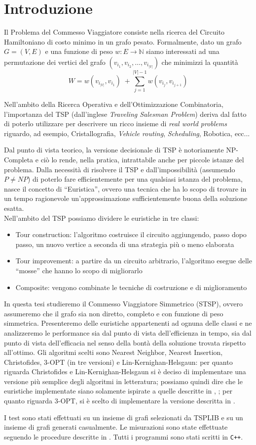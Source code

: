 \chapter*{Introduzione}

Il Problema del Commesso Viaggiatore consiste nella ricerca del Circuito Hamiltoniano
di costo minimo in un grafo pesato. Formalmente, dato un grafo $G=(V,E)$ e una funzione di peso
$w: E \rightarrow \mathbb{N}$ siamo interessati ad una permutazione dei vertici del grafo
$(v_{i_1}, v_{i_2}, \dots, v_{i_{|V|}})$ che minimizzi la quantità
$$W = w(v_{i_{|V|}}, v_{i_1}) \;+ \displaystyle\sum_{j=1}^{|V|-1}{w(v_{i_j}, v_{i_{j+1}})}$$

Nell'ambito della Ricerca Operativa e dell'Ottimizzazione
Combinatoria, l'importanza del TSP (dall'inglese \textit{Traveling Salesman Problem}) deriva dal 
fatto di poterlo utilizzare per descrivere un ricco insieme di \textit{real world problems} riguardo, 
ad esempio, Cristallografia, \textit{Vehicle routing}, \textit{Scheduling}, Robotica, ecc...

Dal punto di vista teorico, la versione decisionale di TSP è notoriamente NP-Completa e ciò lo
rende, nella pratica, intrattabile anche per piccole istanze del problema.
Dalla necessità di risolvere il TSP e dall'impossibilità (assumendo $P\neq{}NP$) di poterlo
fare efficientemente per una qualsiasi istanza del problema, nasce il concetto di ``Euristica'', ovvero una tecnica che ha
lo scopo di trovare in un tempo ragionevole un'approssimazione sufficientemente buona della soluzione esatta.
\ \\
Nell'ambito del TSP possiamo dividere le euristiche in tre classi:
\begin{itemize}
    \item Tour construction: l'algoritmo costruisce il circuito aggiungendo, passo dopo passo, un nuovo
            vertice a seconda di una strategia più o meno elaborata
    \item Tour improvement: a partire da un circuito arbitrario, l'algoritmo esegue delle ``mosse'' che hanno
            lo scopo di migliorarlo
    \item Composite: vengono combinate le tecniche di costruzione e di miglioramento
\end{itemize}

In questa tesi studieremo il Commesso Viaggiatore Simmetrico (STSP), ovvero assumeremo
che il grafo sia non diretto, completo e con funzione di peso simmetrica. Presenteremo delle euristiche
appartenenti ad ognuna delle classi e ne analizzeremo le performance sia dal punto di vista dell'efficienza
in tempo, sia dal punto di vista dell'efficacia nel senso della bontà della soluzione trovata rispetto all'ottimo.
Gli algoritmi scelti sono Nearest Neighbor, Nearest Insertion, Christofides, 3-OPT (in tre versioni) e 
Lin-Kernighan-Helsgaun: per quanto riguarda Christofides e Lin-Kernighan-Helsgaun si è deciso di implementare 
una versione più semplice degli algoritmi in letteratura; possiamo quindi dire che le euristiche implementate 
siano solamente ispirate a quelle descritte in \cite{CHR}, \cite{LKH}; per quanto riguarda 3-OPT, 
si è scelto di implementare la versione descritta in \cite{3opt}.

I test sono stati effettuati su un insieme di grafi selezionati da TSPLIB\cite{tsplib} e su un insieme di grafi generati
casualmente. Le misurazioni sono state effettuate seguendo le procedure descritte in \cite{Poli}. Tutti i programmi sono 
stati scritti in \texttt{C++}.
